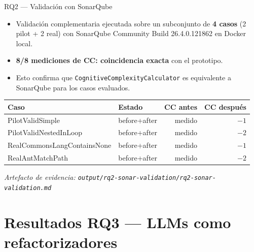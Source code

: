 \documentclass[aspectratio=169, 10pt]{beamer}
\newcommand{\ok}[1]{\textcolor{okgreen}{\textbf{#1}}}
\begin{document}
\begin{frame}{RQ2 --- Validación con SonarQube}
  \begin{itemize}
    \item Validación complementaria ejecutada sobre un subconjunto de
          \textbf{4 casos} (2 pilot + 2 real) con
          SonarQube Community Build 26.4.0.121862 en Docker local.
    \item \ok{8/8 mediciones de CC: coincidencia exacta} con el prototipo.
    \item Esto confirma que \texttt{CognitiveComplexityCalculator} es
          equivalente a SonarQube para los casos evaluados.
  \end{itemize}

  \vspace{0.4em}
  \begin{table}
    \centering
    \footnotesize
    \begin{tabular}{llrr}
      \toprule
      \textbf{Caso} & \textbf{Estado} & \textbf{CC antes} & \textbf{CC después} \\
      \midrule
      PilotValidSimple           & before+after & medido & $-1$ \\
      PilotValidNestedInLoop     & before+after & medido & $-2$ \\
      RealCommonsLangContainsNone & before+after & medido & $-1$ \\
      RealAntMatchPath           & before+after & medido & $-2$ \\
      \bottomrule
    \end{tabular}
  \end{table}

  \footnotesize
  \textit{Artefacto de evidencia: \texttt{output/rq2-sonar-validation/rq2-sonar-validation.md}}
\end{frame}

\section{Resultados RQ3 — LLMs como refactorizadores}
\end{document}
